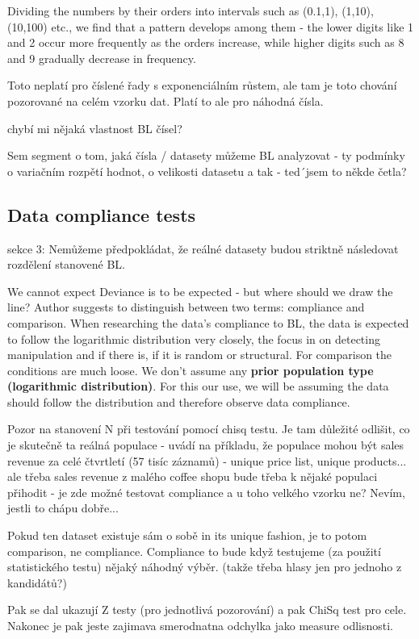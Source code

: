 Dividing the numbers by their orders into intervals such as (0.1,1), (1,10), (10,100) etc., we find that a pattern develops among them - the lower digits like 1 and 2 occur more frequently as the orders increase, while higher digits such as 8 and 9 gradually decrease in frequency.\cite{kossovsky2014benford} %

\begin{koment}
    Toto neplatí pro číslené řady s exponenciálním růstem, ale tam je toto chování pozorované na celém vzorku dat. Platí to ale pro náhodná čísla. 
\end{koment}

\begin{koment}
chybí mi nějaká vlastnost BL čísel? 
\end{koment}

\begin{koment}
Sem segment o tom, jaká čísla / datasety můžeme BL analyzovat - ty podmínky o variačním rozpětí hodnot, o velikosti datasetu a tak - ted´jsem to někde četla? 
\end{koment}


\subsection{Data compliance tests}

\cite{kossovsky2014benford} sekce 3: 
Nemůžeme předpokládat, že reálné datasety budou striktně následovat rozdělení stanovené BL. 

We cannot expect 
Deviance is to be expected - but where should we draw the line? Author suggests to distinguish between two terms: compliance and comparison. When researching the data's compliance to BL, the data is expected to follow the logarithmic distribution very closely, the focus in on detecting manipulation and if there is, if it is random or structural. For comparison the conditions are much loose. We don't assume any \textbf{prior population type (logarithmic distribution)}. For this our use, we will be assuming the data should follow the distribution and therefore observe data compliance.

\begin{koment}
    Pozor na stanovení N při testování pomocí chisq testu.
    Je tam důležité odlišit, co je skutečně ta reálná populace - uvádí na příkladu, že populace mohou být sales revenue za celé čtvrtletí (57 tisíc záznamů) - unique price list, unique products... ale třeba sales revenue z malého coffee shopu bude třeba k nějaké populaci přihodit - je zde možné testovat compliance a u toho velkého vzorku ne? Nevím, jestli to chápu dobře... 

    Pokud ten dataset existuje sám o sobě in its unique fashion, je to potom comparison, ne compliance. Compliance to bude když testujeme (za použití statistického testu) nějaký náhodný výběr. (takže třeba hlasy jen pro jednoho z kandidátů?) 

    Pak se dal ukazují Z testy (pro jednotlivá pozorování) a pak ChiSq test pro cele. Nakonec je pak jeste zajimava smerodnatna odchylka jako measure odlisnosti. 
\end{koment}






